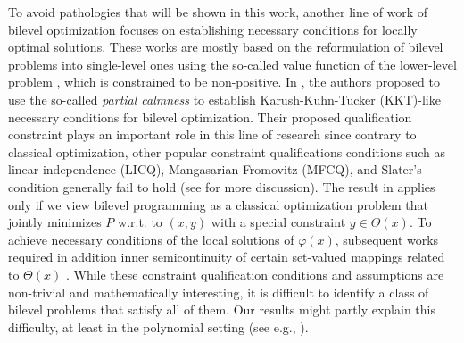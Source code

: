 \documentclass{article}
\newcommand{\firstvar}{x}
\newcommand{\secondvar}{y}
\newcommand{\valbilevel}{\varphi}
\newcommand{\jer}[1]{[[\textcolor{magenta}{#1}]]}
\theoremstyle{plain}
\theoremstyle{definition}
\begin{document}
\begin{appendices}
To avoid pathologies that will be shown in this work, another line of work of bilevel optimization focuses on establishing necessary conditions for locally optimal solutions. These works \cite{ye1995optimality,dempe2012sensitivity,Mordukhovich2020,hendrion2011calmness} are mostly based on the reformulation of bilevel problems into single-level ones using the so-called value function of the lower-level problem \cite{chen1995nonlinear}, which is constrained to be non-positive. In \cite{ye1995optimality}, the authors proposed to use the so-called \emph{partial calmness} to establish Karush-Kuhn-Tucker (KKT)-like necessary conditions for bilevel optimization. Their proposed qualification constraint plays an important role in this line of research since contrary to classical optimization, other popular constraint qualifications conditions such as linear independence (LICQ), Mangasarian-Fromovitz (MFCQ), and Slater's condition generally fail to hold %
(see \cite[Proposition 4.1]{ye1995optimality} for more discussion). The result in \cite{ye1995optimality} applies only if we view bilevel programming as a classical optimization problem that jointly minimizes $P$ w.r.t. to $(\firstvar,\secondvar)$ with a special constraint $\secondvar \in \Theta(\firstvar)$. To achieve necessary conditions of the local solutions of $\valbilevel(\firstvar)$, subsequent works required in addition inner semicontinuity of certain set-valued mappings related to $\Theta(\firstvar)$ \cite{dempe2012sensitivity,Mordukhovich2020,hendrion2011calmness}. While these constraint qualification conditions and assumptions are non-trivial and mathematically interesting, it is difficult to identify a class of bilevel problems that satisfy all of them. Our results might partly explain this difficulty, at least in the polynomial setting (see e.g., ). %


\end{appendices}
\end{document}
